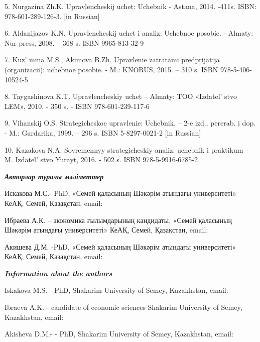5. Nurgazina Zh.K. Upravlencheskij uchet: Uchebnik - Astana, 2014.
-411s. ISBN: 978-601-289-126-3. {[}in Russian{]}

6. Aldanijazov K.N. Upravlencheskij uchet i analiz: Uchebnoe posobie. -
Almaty: Nur-press, 2008. -- 368 s. ISBN 9965-813-32-9

7. Kuz' mina M.S., Akimova B.Zh. Upravlenie zatratami
predprijatija (organizacii): uchebnoe posobie. - M.: KNORUS, 2015. --
310 s. ISBN 978-5-406-10524-5

8. Taygashinova K.T. Upravlencheskiy uchet -- Almaty: TOO
«Izdatel' stvo LEM», 2010. - 350 s. - ISBN
978-601-239-117-6

9. Vihanskij O.S. Strategicheskoe upravlenie: Uchebnik. -- 2-e izd.,
pererab. i dop. - M.: Gardarika, 1999. -- 296 s. ISBN 5-8297-0021-2
{[}in Russian{]}

10. Kazakova N.A. Sovremennyy strategicheskiy analiz: uchebnik i
praktikum -- M. Izdatel' stvo Yurayt, 2016. - 502 s. ISBN
978-5-9916-6785-2

\emph{{\bfseries Авторлар туралы мәліметтер}}

Искакова М.С.- PhD, «Семей қаласының Шәкәрім атындағы университеті»
КеАҚ, Семей, Қазақстан, email:


Ибраева А.К. -- экономика ғылымдарының кандидаты, «Семей қаласының
Шәкәрім атындағы университеті» КеАҚ, Семей, Қазақстан, email:


Акишева Д.М. -PhD, «Семей қаласының Шәкәрім атындағы университеті» КеАҚ,
Семей, Қазақстан, email:


\emph{{\bfseries Information about the authors}}

Iskakova M.S. - PhD, Shakarim University of Semey, Kazakhstan, email:


Ibraeva A.K. - candidate of economic sciences Shakarim University of
Semey, Kazakhstan, email:


Akisheva D.M.- - PhD, Shakarim University of Semey, Kazakhstan, email:
\href{mailto:Dana_m@mail.ru}{}\
